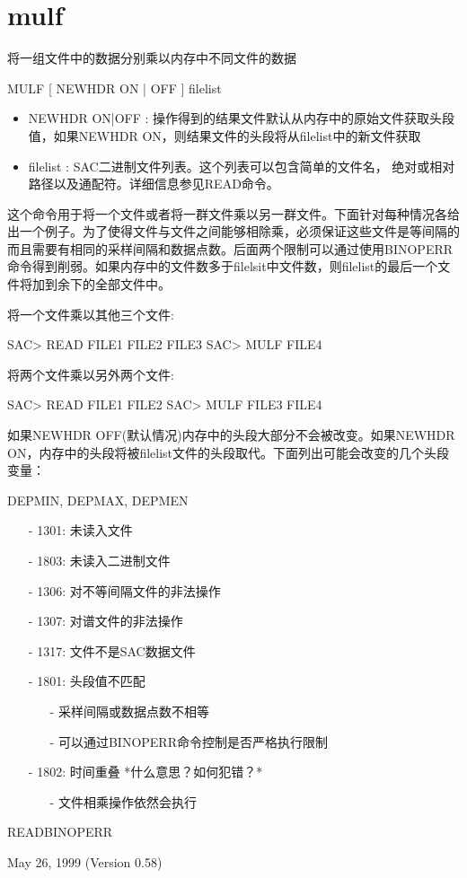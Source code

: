 \section{mulf}
\label{cmd:mulf}

将一组文件中的数据分别乘以内存中不同文件的数据

MULF [ NEWHDR ON | OFF ] filelist

\begin{itemize}
\item NEWHDR ON|OFF : 操作得到的结果文件默认从内存中的原始文件获取头段值，如果NEWHDR ON，则结果文件的头段将从filelist中的新文件获取 
\item filelist : SAC二进制文件列表。这个列表可以包含简单的文件名， 绝对或相对路径以及通配符。详细信息参见READ命令。
\end{itemize}

这个命令用于将一个文件或者将一群文件乘以另一群文件。下面针对每种情况各给出一个例子。为了使得文件与文件之间能够相除乘，必须保证这些文件是等间隔的而且需要有相同的采样间隔和数据点数。后面两个限制可以通过使用BINOPERR命令得到削弱。如果内存中的文件数多于filelsit中文件数，则filelist的最后一个文件将加到余下的全部文件中。

将一个文件乘以其他三个文件:
\begin{SACCode}
SAC> READ FILE1 FILE2 FILE3
SAC> MULF FILE4
\end{SACCode}

将两个文件乘以另外两个文件:
\begin{SACCode}
SAC> READ FILE1 FILE2
SAC> MULF FILE3 FILE4
\end{SACCode}

如果NEWHDR OFF(默认情况)内存中的头段大部分不会被改变。如果NEWHDR ON，内存中的头段将被filelist文件的头段取代。下面列出可能会改变的几个头段变量：

DEPMIN, DEPMAX, DEPMEN

\begin{itemize}
\item[-]1301: 未读入文件
\item[-]1803: 未读入二进制文件
\item[-]1306: 对不等间隔文件的非法操作
\item[-]1307: 对谱文件的非法操作
\item[-]1317: 文件不是SAC数据文件
\item[-]1801: 头段值不匹配
	\begin{itemize}
	\item[-]采样间隔或数据点数不相等
	\item[-]可以通过BINOPERR命令控制是否严格执行限制
	\end{itemize}
\end{itemize}

\begin{itemize}
\item[-]1802: 时间重叠  *什么意思？如何犯错？*
	\begin{itemize}
	\item[-]文件相乘操作依然会执行
	\end{itemize}
\end{itemize}

READBINOPERR

May 26, 1999 (Version 0.58)
